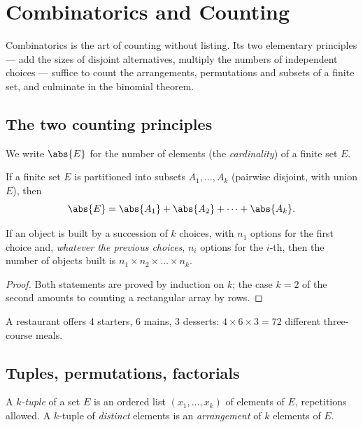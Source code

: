 \chapter{Combinatorics and Counting}\label{ch:tle:comb}

Combinatorics is the art of counting without listing. Its two elementary
principles --- add the sizes of disjoint alternatives, multiply the numbers
of independent choices --- suffice to count the arrangements, permutations
and subsets of a finite set, and culminate in the binomial theorem.

\section{The two counting principles}

We write $\abs{E}$ for the number of elements (the \emph{cardinality}) of a
finite set $E$.

\begin{proposition}\label{prop:tle:comb:addition}
If a finite set $E$ is partitioned into subsets $A_1, \dots, A_k$ (pairwise
disjoint, with union $E$), then
\[
\abs{E} = \abs{A_1} + \abs{A_2} + \dots + \abs{A_k}.
\]
\end{proposition}

\begin{proposition}\label{prop:tle:comb:multiplication}
If an object is built by a succession of $k$ choices, with $n_1$ options for
the first choice and, \emph{whatever the previous choices}, $n_i$ options for
the $i$-th, then the number of objects built is
$n_1 \times n_2 \times \dots \times n_k$.
\end{proposition}

\begin{proof}
Both statements are proved by induction on $k$; the case $k = 2$ of the
second amounts to counting a rectangular array by rows.
\end{proof}

\begin{example}
A restaurant offers 4 starters, 6 mains, 3 desserts: $4 \times 6 \times 3 =
72$ different three-course meals.
\end{example}

\section{Tuples, permutations, factorials}

\begin{definition}[$k$-tuples]\label{def:tle:comb:tuples}
A \emph{$k$-tuple} of a set $E$ is an ordered list $(x_1, \dots, x_k)$ of
elements of $E$, repetitions allowed. A $k$-tuple of \emph{distinct}
elements is an \emph{arrangement} of $k$ elements of $E$.
\end{definition}

